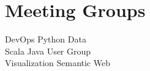 \documentclass[letterpaper]{deedy-resume} %
\begin{document}
\begin{minipage}[t]{0.33\textwidth}
\sectionspace %


\section{Meeting Groups}

DevOps \textbullet{} Python \textbullet{} Data \\
Scala \textbullet{} Java User Group \\
Visualization \textbullet{} Semantic Web

\sectionspace %


\end{minipage} %
\hfill
%
%
\end{document}
